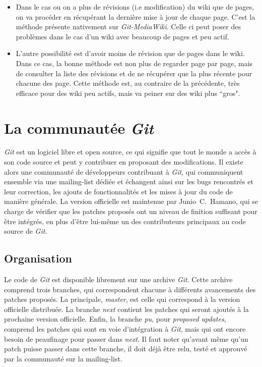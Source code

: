 \documentclass[11pt]{article}
\begin{document}
\begin{itemize}
\item Dans le cas ou on a plus de révisions (i.e modification) du wiki 
  que de pages, on va procéder en récupérant la dernière mise à jour de chaque
  page. C'est la méthode présente nativement sur \textit{Git-MediaWiki}. Celle
  ci peut poser des problèmes dans le cas d'un wiki avec beaucoup de pages et
  peu actif.\\
\item L'autre possibilité est d'avoir moins de révision que de pages dans le
  wiki. Dans ce cas, la bonne méthode est non plus de regarder page par page,
  mais de consulter la liste des révisions et de ne récupérer que la plus récente
  pour chacune des page. Cette méthode est, au contraire de la précédente, très
  efficace pour des wiki peu actifs, mais va peiner sur des wiki plus ``gros". 
\end{itemize}

\section{La communautée \textit{Git}}

\textit{Git} est un logiciel libre et open source, ce qui signifie que
tout le monde a accès à son code source et peut y contribuer en
proposant des modifications. Il existe alors une communauté de
développeurs contribuant à \textit{Git}, qui communiquent ensemble via
une mailing-list dédiée et échangent ainsi sur les bugs rencontrés et
leur correction, les ajouts de fonctionnalités et les mises à jour du
code de manière générale. La version officielle est maintenue par
Junio~C.~Hamano, qui se charge de vérifier que les patches proposés
ont un niveau de finition suffisant pour être intégrés, en plus d'être
lui-même un des contributeurs principaux au code source de \textit{Git}.

\subsection{Organisation}

Le code de \textit{Git} est disponible librement sur une archive
\textit{Git}. Cette archive comprend trois branches, qui correspondent
chacune à différents avancements des patches proposés. La principale,
\textit{master}, est celle qui correspond à la version officielle
distribuée. La branche \textit{next} contient les patches qui seront
ajoutés à la prochaine version officielle. Enfin, la branche
\textit{pu}, pour \textit{proposed updates}, comprend les patches qui
sont en voie d'intégration à \textit{Git}, mais qui ont encore besoin
de peaufinage pour passer dans \textit{next}. Il faut noter qu'avant
même qu'un patch puisse passer dans cette branche, il doit déjà être
relu, testé et approuvé par la communauté sur la mailing-list.
\end{document}
